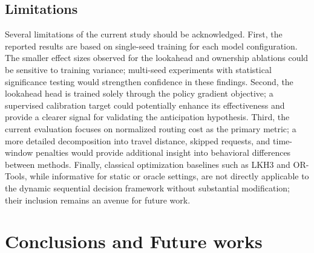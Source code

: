 \documentclass[conference]{IEEEtran}
\begin{document}
\subsection{Limitations}

Several limitations of the current study should be acknowledged. First, the reported results are based on single-seed training for each model configuration. The smaller effect sizes observed for the lookahead and ownership ablations could be sensitive to training variance; multi-seed experiments with statistical significance testing would strengthen confidence in these findings. Second, the lookahead head is trained solely through the policy gradient objective; a supervised calibration target could potentially enhance its effectiveness and provide a clearer signal for validating the anticipation hypothesis. Third, the current evaluation focuses on normalized routing cost as the primary metric; a more detailed decomposition into travel distance, skipped requests, and time-window penalties would provide additional insight into behavioral differences between methods. Finally, classical optimization baselines such as LKH3 and OR-Tools, while informative for static or oracle settings, are not directly applicable to the dynamic sequential decision framework without substantial modification; their inclusion remains an avenue for future work.

\section{Conclusions and Future works} \label{sec:futurework}


\printglossaries
\end{document}

